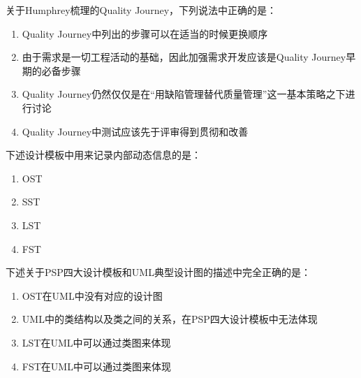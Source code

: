 \begin{problem}
	关于Humphrey梳理的Quality Journey，下列说法中正确的是： 
        \begin{enumerate}[label=\Alph*.]
            \item Quality Journey中列出的步骤可以在适当的时候更换顺序
            \item 由于需求是一切工程活动的基础，因此加强需求开发应该是Quality Journey早期的必备步骤
            \item Quality Journey仍然仅仅是在“用缺陷管理替代质量管理”这一基本策略之下进行讨论
            \item Quality Journey中测试应该先于评审得到贯彻和改善
        \end{enumerate}
\end{problem}



\begin{problem}
	下述设计模板中用来记录内部动态信息的是：
    \vspace{-0.8em}
    \begin{multicols}{4}
        \begin{enumerate}[label=\Alph*.]
            \item OST
            \item SST
            \item LST
            \item FST
        \end{enumerate}
    \end{multicols}
    \vspace{-1em}
\end{problem}



\begin{problem}
	下述关于PSP四大设计模板和UML典型设计图的描述中完全正确的是： 
        \begin{enumerate}[label=\Alph*.]
            \item OST在UML中没有对应的设计图
            \item UML中的类结构以及类之间的关系，在PSP四大设计模板中无法体现
            \item LST在UML中可以通过类图来体现
            \item FST在UML中可以通过类图来体现
        \end{enumerate}
\end{problem}



